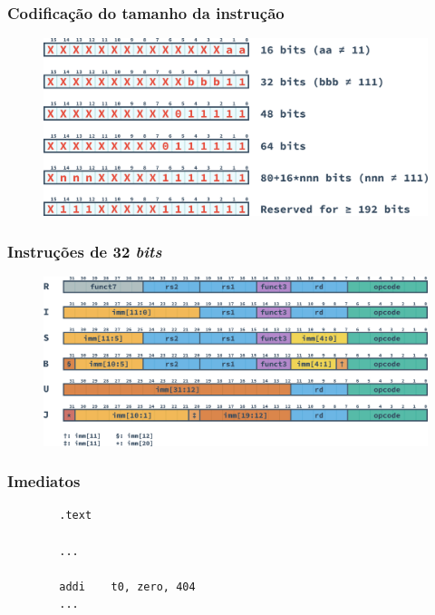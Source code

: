 \documentclass[aspectratio=169]{beamer}
\begin{document}
    \begin{frame}
        \frametitle{Codificação do tamanho da instrução}
        \vfill
        \begin{figure}[H]
        \centering
            \includegraphics[width=.8\textwidth,height=.8\textheight,keepaspectratio]
            {../images/instructions/rv_encoding.png}
        \end{figure}
        \vfill
    \end{frame}

    \begin{frame}
        \frametitle{Instruções de 32 \textit{bits}}
        \vfill
        \begin{figure}[H]
        \centering
            \includegraphics[width=.8\textwidth,height=.8\textheight,keepaspectratio]
            {../images/instructions/rv32_instructions.png}
        \end{figure}
        \vfill
    \end{frame}

    \begin{frame}[fragile]
        \frametitle{Imediatos}
        \vfill
        \begin{lstlisting}
        .text

        ...

        addi    t0, zero, 404
        ...
        \end{lstlisting}
        \vfill
    \end{frame}
\end{document}
